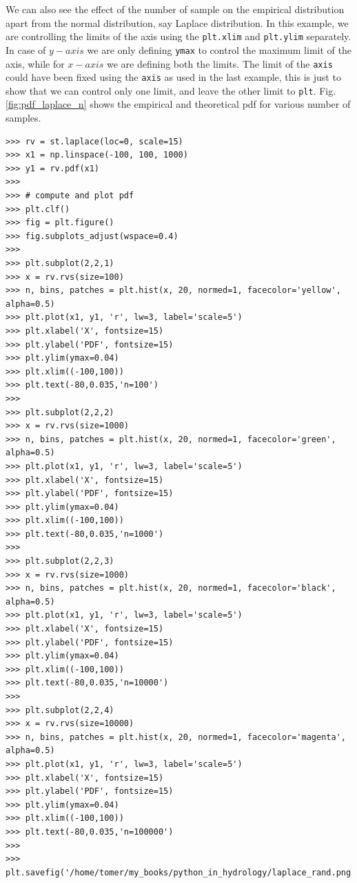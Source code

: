 \documentclass[10pt]{book}
\begin{document}
{We can also see the effect of the number of sample on the empirical distribution apart from the normal distribution, say Laplace distribution. In this example, we are controlling the limits of the axis using the \verb"plt.xlim" and \verb"plt.ylim" separately. In case of $y-axis$ we are only defining \verb"ymax" to control the maximum limit of the axis, while for $x-axis$ we are defining both the limits. The limit of the \verb"axis" could have been fixed using the \verb"axis" as used in the last example, this is just to show that we can control only one limit, and leave the other limit to \verb"plt". Fig. \ref{fig:pdf_laplace_n} shows the empirical and theoretical pdf for various number of samples. 
\beforeverb \begin{verbatim}
>>> rv = st.laplace(loc=0, scale=15)
>>> x1 = np.linspace(-100, 100, 1000)
>>> y1 = rv.pdf(x1)
>>> 
>>> # compute and plot pdf
>>> plt.clf()
>>> fig = plt.figure()
>>> fig.subplots_adjust(wspace=0.4)
>>>  
>>> plt.subplot(2,2,1)
>>> x = rv.rvs(size=100)
>>> n, bins, patches = plt.hist(x, 20, normed=1, facecolor='yellow', alpha=0.5)
>>> plt.plot(x1, y1, 'r', lw=3, label='scale=5')
>>> plt.xlabel('X', fontsize=15)
>>> plt.ylabel('PDF', fontsize=15)
>>> plt.ylim(ymax=0.04)
>>> plt.xlim((-100,100))
>>> plt.text(-80,0.035,'n=100')
>>> 
>>> plt.subplot(2,2,2)
>>> x = rv.rvs(size=1000)
>>> n, bins, patches = plt.hist(x, 20, normed=1, facecolor='green', alpha=0.5)
>>> plt.plot(x1, y1, 'r', lw=3, label='scale=5')
>>> plt.xlabel('X', fontsize=15)
>>> plt.ylabel('PDF', fontsize=15)
>>> plt.ylim(ymax=0.04)
>>> plt.xlim((-100,100))
>>> plt.text(-80,0.035,'n=1000')
>>> 
>>> plt.subplot(2,2,3)
>>> x = rv.rvs(size=1000)
>>> n, bins, patches = plt.hist(x, 20, normed=1, facecolor='black', alpha=0.5)
>>> plt.plot(x1, y1, 'r', lw=3, label='scale=5')
>>> plt.xlabel('X', fontsize=15)
>>> plt.ylabel('PDF', fontsize=15)
>>> plt.ylim(ymax=0.04)
>>> plt.xlim((-100,100))
>>> plt.text(-80,0.035,'n=10000')
>>> 
>>> plt.subplot(2,2,4)
>>> x = rv.rvs(size=10000)
>>> n, bins, patches = plt.hist(x, 20, normed=1, facecolor='magenta', alpha=0.5)
>>> plt.plot(x1, y1, 'r', lw=3, label='scale=5')
>>> plt.xlabel('X', fontsize=15)
>>> plt.ylabel('PDF', fontsize=15)
>>> plt.ylim(ymax=0.04)
>>> plt.xlim((-100,100))
>>> plt.text(-80,0.035,'n=100000')
>>> 
>>> plt.savefig('/home/tomer/my_books/python_in_hydrology/laplace_rand.png')
\end{verbatim} \afterverb

}
\end{document}
